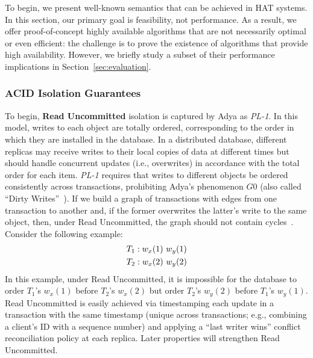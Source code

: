 To begin, we present well-known semantics that can be achieved in HAT
systems. In this section, our primary goal is feasibility, not
performance. As a result, we offer proof-of-concept highly available
algorithms that are not necessarily optimal or even efficient: the
challenge is to prove the existence of algorithms that provide high
availability. However, we briefly study a subset of their performance
implications in Section~\ref{sec:evaluation}.

\subsubsection{ACID Isolation Guarantees}
\label{sec:isolation}

To begin, \textbf{Read Uncommitted} isolation is captured by Adya as
\textit{PL-1}. In this model, writes to each object are totally
ordered, corresponding to the order in which they are installed in the
database. In a distributed database, different replicas may receive
writes to their local copies of data at different times but should
handle concurrent updates (i.e., overwrites) in accordance with the
total order for each item. \textit{PL-1} requires that writes to
different objects be ordered consistently across transactions,
prohibiting Adya's phenomenon $G0$ (also called ``Dirty
Writes''~\cite{ansicritique}). If we build a graph of transactions
with edges from one transaction to another and, if the former overwrites
the latter's write to the same object, then, under Read Uncommitted,
the graph should not contain cycles~\cite{adya}. Consider the
following example:
\begin{align*}
\small\vspace{-1em}
T_1 &: w_x(1)~w_y(1)
\\T_2 &: w_x(2)~w_y(2)
\end{align*}
In this example, under Read Uncommitted, it is impossible for the
database to order $T_1$'s $w_x(1)$ before $T_2$'s $w_x(2)$ but order
$T_2$'s $w_y(2)$ before $T_1$'s $w_y(1)$. Read Uncommitted is easily
achieved via timestamping each update in a transaction with the same
timestamp (unique across transactions; e.g., combining a client's ID
with a sequence number) and applying a ``last writer wins'' conflict
reconciliation policy at each replica. Later properties will
strengthen Read Uncommitted.

